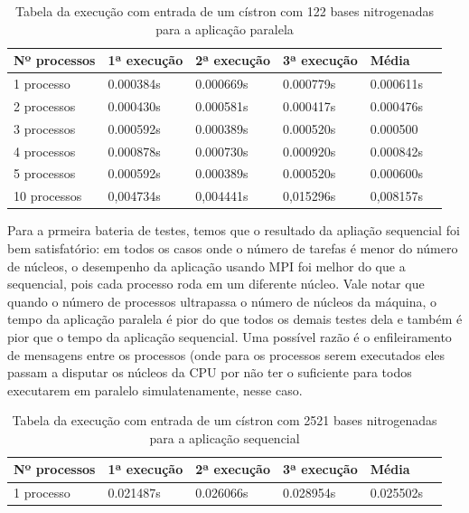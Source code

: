 \documentclass[a4paper,10pt]{article}
\begin{document}
\begin{table}[!htb]
\begin{tabular}{| l | l | l | l | l | p{5cm} |} 
\hline
  Nº processos & 1ª execução & 2ª execução & 3ª execução & Média\\ \hline
1 processo   &	0.000384s &  0.000669s    & 0.000779s  &  0.000611s \\ \hline
2 processos &	0.000430s & 0.000581s &  0.000417s    &  0.000476s\\ \hline
3 processos & 0.000592s & 0.000389s & 0.000520s &  0.000500  \\ \hline
4 processos & 0.000878s & 0.000730s & 0.000920s  &  0.000842s  \\ \hline
5 processos  &  0.000592s & 0.000389s & 0.000520s  &  0.000600s  \\ \hline
10 processos & 0,004734s  &  0,004441s  &  0,015296s  &  0,008157s \\ \hline
\end{tabular}
\caption{Tabela da execução com entrada de um cístron com 122 bases nitrogenadas para a aplicação paralela}
\end{table}

Para a prmeira bateria de testes, temos que o resultado da apliação sequencial foi bem satisfatório: em todos os casos onde o número de tarefas é menor do número de núcleos, o desempenho da aplicação usando MPI foi melhor do que a sequencial, pois cada processo roda em um diferente núcleo. Vale notar que quando o número de processos ultrapassa o número de núcleos da máquina, o tempo da aplicação paralela é pior do que todos os demais testes dela e também é pior que o tempo da aplicação sequencial. Uma possível razão é o enfileiramento de mensagens entre os processos (onde para os processos serem executados eles passam a disputar os núcleos da CPU por não ter o suficiente para todos executarem em paralelo simulatenamente, nesse caso.
\newpage
\begin{table}[!htb]
\begin{tabular}{| l | l | l | l | l | p{5cm} |} 
\hline
  Nº processos & 1ª execução & 2ª execução & 3ª execução & Média\\ \hline
1 processo   &	0.021487s  &  0.026066s  &  0.028954s & 0.025502s\\ \hline

\end{tabular}
\caption{Tabela da execução com entrada de um cístron com 2521 bases nitrogenadas para a aplicação sequencial}
\end{table}
\end{document}
